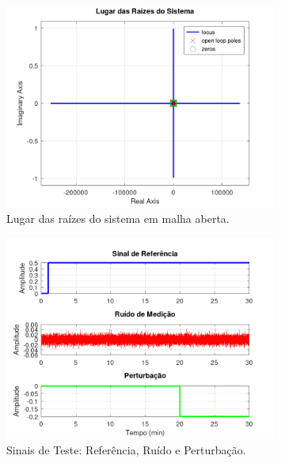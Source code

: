 \documentclass[a4paper,12pt]{article}
\begin{document}
\begin{figure}[H]
    \centering
    \includegraphics[width=0.8\textwidth]{figura_lugar_raizes.png}
    \caption{Lugar das raízes do sistema em malha aberta.}
    \label{fig:lr_main}
\end{figure}

\begin{figure}[H]
    \centering
    \includegraphics[width=0.8\textwidth]{figura_sinais_teste.png}
    \caption{Sinais de Teste: Referência, Ruído e Perturbação.}
    \label{fig:sinais_teste_main}
\end{figure}
\end{document}
